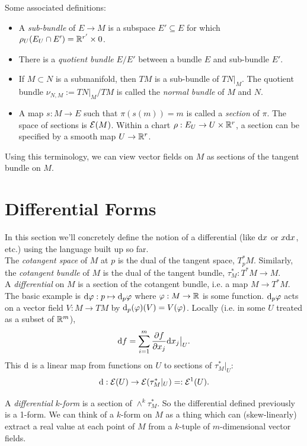 \documentclass{amsart}
\begin{document}
Some associated definitions:
\begin{itemize}
	\item A \textit{sub-bundle} of $E\to M$ is a subspace $E'\subseteq E$ for which $\rho_U(E_U\cap E')=\mathbb{R}^{r'}\times 0$.
	\item There is a \textit{quotient bundle} $E/E'$ between a bundle $E$ and sub-bundle $E'$.
	\item If $M\subset N$ is a submanifold, then $TM$ is a sub-bundle of $TN|_M$. The quotient bundle $\nu_{N,M}:=TN|_M/TM$ is called the \textit{normal bundle} of $M$ and $N$. 
	\item A map $s:M\to E$ such that $\pi(s(m))=m$ is called a \textit{section} of $\pi$. The space of sections is $\mathcal{E}(M)$. Within a chart $\rho:E_U\to U\times \mathbb{R}^r$, a section can be specified by a smooth map $U\to \mathbb{R}^r$.\\
\end{itemize}

Using this terminology, we can view vector fields on $M$ as sections of the tangent bundle on $M$.

\newpage

\section{Differential Forms}

In this section we'll concretely define the notion of a differential (like $\textrm{d} x$ or $x\textrm{d} x$, etc.) using the language built up so far.\\

The \textit{cotangent space} of $M$ at $p$ is the dual of the tangent space, $T_p^*M$. Similarly, the \textit{cotangent bundle} of $M$ is the dual of the tangent bundle, $\tau_M^*:T^*M\to M$.\\

A \textit{differential} on $M$ is a section of the cotangent bundle, i.e. a map $M\to T^*M$. The basic example is $\textrm{d}\varphi:p\mapsto \textrm{d}_p\varphi$ where $\varphi:M\to \mathbb{R}$ is some function. $\textrm{d}_p\varphi$ acts on a vector field $V:M\to TM$ by $\textrm{d}_p(\varphi)(V) = V(\varphi)$. Locally (i.e. in some $U$ treated as a subset of $\mathbb{R}^m$),
$$
\textrm{d} f = \sum_{i=1}^m \frac{\partial f}{\partial x_j} \textrm{d} x_j\big|_{U}.
$$
This $\textrm{d}$ is a linear map from functions on $U$ to sections of $\tau^*_M|_U$: 
$$\textrm{d}:\mathcal{E}(U)\to \mathcal{E}(\tau^*_M|_{U}) =: \mathcal{E}^1(U).$$

A \textit{differential} $k$-\textit{form} is a section of $\wedge^k\tau_M^*$. So the differential defined previously is a 1-form. We can think of a $k$-form on $M$ as a thing which can (skew-linearly) extract a real value at each point of $M$ from a $k$-tuple of $m$-dimensional vector fields.\\
\end{document}
